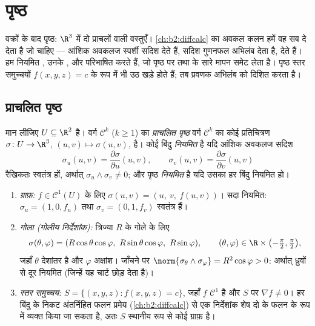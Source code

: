 \chapter{पृष्ठ}\label{ch:b2:surfaces}

वक्रों के बाद पृष्ठ: $\R^3$ में दो प्राचलों वाली वस्तुएँ।
\cref{ch:b2:diffcalc} का अवकल कलन हमें वह सब दे देता है जो चाहिए ---
आंशिक अवकलज स्पर्शी सदिश देते हैं, सदिश गुणनफल अभिलंब देता है,
  देते हैं। हम नियमित , उनके , और \emph{} परिभाषित करते हैं, जो पृष्ठ पर
 तथा  के सारे मापन समेट लेता है। पृष्ठ स्तर समुच्चयों
$f(x, y, z) = c$ के रूप में भी उठ खड़े होते हैं; तब प्रवणक अभिलंब को दिशित करता है।

\section{प्राचलित पृष्ठ}

\begin{definition}[नियमित प्राचलित पृष्ठ]\label{def:b2:surfaces:param}
मान लीजिए $U \subseteq \R^2$  है। वर्ग $\mathcal{C}^k$ ($k \geq 1$) का \emph{प्राचलित
पृष्ठ} वर्ग $\mathcal{C}^k$ का कोई प्रतिचित्रण $\sigma \colon U \to
\R^3$,
$(u, v) \mapsto \sigma(u, v)$, है। कोई बिंदु \emph{नियमित} है यदि आंशिक अवकलज सदिश
\[
\sigma_u(u, v) = \frac{\partial\sigma}{\partial u}(u,v),
\qquad
\sigma_v(u, v) = \frac{\partial\sigma}{\partial v}(u,v)
\]
रैखिकतः स्वतंत्र हों, अर्थात् $\sigma_u \wedge \sigma_v \neq 0$;
और पृष्ठ \emph{नियमित} है यदि उसका हर बिंदु नियमित हो।
\end{definition}

\begin{example}[तीन मानक वर्णन]\label{ex:b2:surfaces:standard}
\leavevmode
\begin{enumerate}
\item \emph{ग्राफ़:} $f \in
\mathcal{C}^1(U)$ के लिए $\sigma(u, v) = (u,\ v,\ f(u, v))$। सदा नियमित: $\sigma_u = (1, 0, f_u)$ तथा
$\sigma_v = (0, 1, f_v)$ स्वतंत्र हैं।
\item \emph{गोला (गोलीय निर्देशांक):} त्रिज्या $R$ के गोले के
लिए
\[
\sigma(\theta, \varphi)
= (R\cos\theta\cos\varphi,\ R\sin\theta\cos\varphi,\
R\sin\varphi),
\qquad
(\theta, \varphi) \in \R \times
\bigl(-\tfrac\pi2, \tfrac\pi2\bigr),
\]
जहाँ $\theta$ देशांतर है और $\varphi$ अक्षांश। जाँचने पर
$\norm{\sigma_\theta \wedge \sigma_\varphi} = R^2\cos\varphi > 0$:
अर्थात् ध्रुवों से दूर नियमित (जिन्हें यह चार्ट छोड़ देता है)।
\item \emph{स्तर समुच्चय:} $S = \{(x,y,z) : f(x, y, z) = c\}$, जहाँ
$f$ $\mathcal{C}^1$ है और $S$ पर $\nabla f \neq 0$। हर बिंदु के निकट
अंतर्निहित फलन प्रमेय (\cref{ch:b2:diffcalc}) से एक निर्देशांक शेष दो
के फलन के रूप में व्यक्त किया जा सकता है, अतः
$S$ स्थानीय रूप से कोई ग्राफ़ है।
\end{enumerate}
\end{example}

